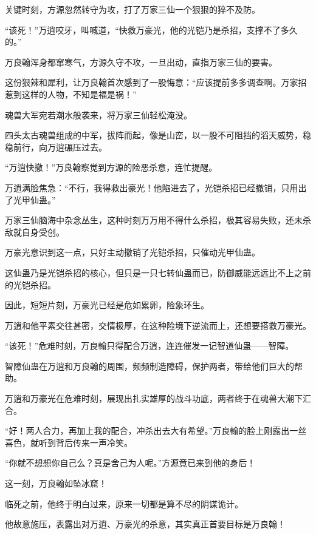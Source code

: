 
\begin{this_body}

关键时刻，方源忽然转守为攻，打了万家三仙一个狠狠的猝不及防。

“该死！”万逍咬牙，叫喊道，“快救万豪光，他的光铠乃是杀招，支撑不了多久的。”

万良翰浑身都窜寒气，方源久守不攻，一旦出动，直指万家三仙的要害。

这份狠辣和犀利，让万良翰首次感到了一股悔意：“应该提前多多调查啊。万家招惹到这样的人物，不知是福是祸！”

魂兽大军宛若潮水般袭来，将万家三仙轻松淹没。

四头太古魂兽组成的中军，拔阵而起，像是山峦，以一股不可阻挡的滔天威势，稳稳前行，向万逍碾压过去。

“万逍快撤！”万良翰察觉到方源的险恶杀意，连忙提醒。

万逍满脸焦急：“不行，我得救出豪光！他陷进去了，光铠杀招已经撤销，只用出了光甲仙蛊。”

万家三仙脑海中杂念丛生，这种时刻万万用不得什么杀招，极其容易失败，还未杀敌就自身受创。

万豪光意识到这一点，只好主动撤销了光铠杀招，只催动光甲仙蛊。

这仙蛊乃是光铠杀招的核心，但只是一只七转仙蛊而已，防御威能远远比不上之前的光铠杀招。

因此，短短片刻，万豪光已经是危如累卵，险象环生。

万逍和他平素交往甚密，交情极厚，在这种险境下逆流而上，还想要搭救万豪光。

“该死！”危难时刻，万良翰只得配合万逍，连连催发一记智道仙蛊——智障。

智障仙蛊在万逍和万良翰的周围，频频制造障碍，保护两者，带给他们巨大的帮助。

万逍和万豪光在危难时刻，展现出扎实雄厚的战斗功底，两者终于在魂兽大潮下汇合。

“好！两人合力，再加上我的配合，冲杀出去大有希望。”万良翰的脸上刚露出一丝喜色，就听到背后传来一声冷笑。

“你就不想想你自己么？真是舍己为人呢。”方源竟已来到他的身后！

这一刻，万良翰如坠冰窟！

临死之前，他终于明白过来，原来一切都是算不尽的阴谋诡计。

他故意施压，表露出对万逍、万豪光的杀意，其实真正首要目标是万良翰！


\end{this_body}
